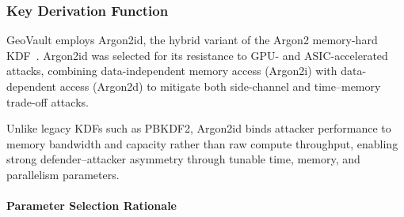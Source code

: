 \documentclass[mathematics,article,accept,pdftex,moreauthors]{Definitions/mdpi}
\begin{document}
\subsubsection{Key Derivation Function}
\label{sec:argon2_parameters}

GeoVault employs Argon2id, the hybrid variant of the Argon2 memory-hard KDF~\cite{7467361}. Argon2id was selected for its resistance to GPU- and ASIC-accelerated attacks, combining data-independent memory access (Argon2i) with data-dependent access (Argon2d) to mitigate both side-channel and time--memory trade-off attacks.

Unlike legacy KDFs such as PBKDF2, Argon2id binds attacker performance to memory bandwidth and capacity rather than raw compute throughput, enabling strong defender--attacker asymmetry through tunable time, memory, and parallelism parameters.

\paragraph*{Parameter Selection Rationale}
\end{document}
